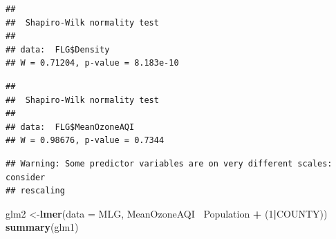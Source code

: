\documentclass[12pt,]{article}
\newenvironment{Shaded}{\begin{snugshade}}{\end{snugshade}}
\newcommand{\KeywordTok}[1]{\textcolor[rgb]{0.13,0.29,0.53}{\textbf{#1}}}
\newcommand{\DataTypeTok}[1]{\textcolor[rgb]{0.13,0.29,0.53}{#1}}
\newcommand{\DecValTok}[1]{\textcolor[rgb]{0.00,0.00,0.81}{#1}}
\newcommand{\StringTok}[1]{\textcolor[rgb]{0.31,0.60,0.02}{#1}}
\newcommand{\CommentTok}[1]{\textcolor[rgb]{0.56,0.35,0.01}{\textit{#1}}}
\newcommand{\OperatorTok}[1]{\textcolor[rgb]{0.81,0.36,0.00}{\textbf{#1}}}
\newcommand{\NormalTok}[1]{#1}
\begin{document}
\begin{verbatim}
## 
##  Shapiro-Wilk normality test
## 
## data:  FLG$Density
## W = 0.71204, p-value = 8.183e-10
\end{verbatim}

\begin{Shaded}
\end{Shaded}

\begin{verbatim}
## 
##  Shapiro-Wilk normality test
## 
## data:  FLG$MeanOzoneAQI
## W = 0.98676, p-value = 0.7344
\end{verbatim}

\begin{Shaded}
\end{Shaded}

\begin{verbatim}
## Warning: Some predictor variables are on very different scales: consider
## rescaling
\end{verbatim}

\begin{Shaded}
\begin{Highlighting}[]
\NormalTok{glm2 <-}\KeywordTok{lmer}\NormalTok{(}\DataTypeTok{data =}\NormalTok{ MLG, MeanOzoneAQI }\OperatorTok{~}\NormalTok{Population }\OperatorTok{+}\StringTok{ }\NormalTok{(}\DecValTok{1}\OperatorTok{|}\NormalTok{COUNTY))}
\KeywordTok{summary}\NormalTok{(glm1)}
\end{Highlighting}
\end{Shaded}
\end{document}
